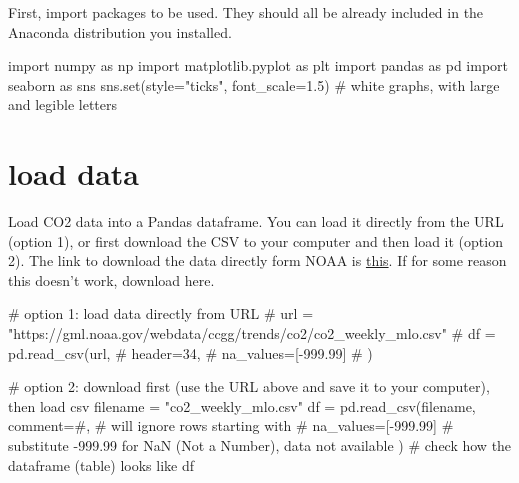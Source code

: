 \documentclass[
  letterpaper,
  DIV=11,
  numbers=noendperiod]{scrreprt}
\newenvironment{Shaded}{\begin{snugshade}}{\end{snugshade}}
\newcommand{\BuiltInTok}[1]{\textcolor[rgb]{0.00,0.23,0.31}{#1}}
\newcommand{\CommentTok}[1]{\textcolor[rgb]{0.37,0.37,0.37}{#1}}
\newcommand{\FloatTok}[1]{\textcolor[rgb]{0.68,0.00,0.00}{#1}}
\newcommand{\ImportTok}[1]{\textcolor[rgb]{0.00,0.46,0.62}{#1}}
\newcommand{\NormalTok}[1]{\textcolor[rgb]{0.00,0.23,0.31}{#1}}
\newcommand{\OperatorTok}[1]{\textcolor[rgb]{0.37,0.37,0.37}{#1}}
\newcommand{\StringTok}[1]{\textcolor[rgb]{0.13,0.47,0.30}{#1}}
\begin{document}
First, import packages to be used. They should all be already included
in the Anaconda distribution you installed.

\begin{Shaded}
\begin{Highlighting}[]
\ImportTok{import}\NormalTok{ numpy }\ImportTok{as}\NormalTok{ np}
\ImportTok{import}\NormalTok{ matplotlib.pyplot }\ImportTok{as}\NormalTok{ plt}
\ImportTok{import}\NormalTok{ pandas }\ImportTok{as}\NormalTok{ pd}
\ImportTok{import}\NormalTok{ seaborn }\ImportTok{as}\NormalTok{ sns}
\NormalTok{sns.}\BuiltInTok{set}\NormalTok{(style}\OperatorTok{=}\StringTok{"ticks"}\NormalTok{, font\_scale}\OperatorTok{=}\FloatTok{1.5}\NormalTok{)  }\CommentTok{\# white graphs, with large and legible letters}
\end{Highlighting}
\end{Shaded}

\section{load data}\label{load-data}

Load CO2 data into a Pandas dataframe. You can load it directly from the
URL (option 1), or first download the CSV to your computer and then load
it (option 2). The link to download the data directly form NOAA is
\href{https://gml.noaa.gov/webdata/ccgg/trends/co2/co2_weekly_mlo.csv}{this}.
If for some reason this doesn't work, download here.

\begin{Shaded}
\begin{Highlighting}[]
\CommentTok{\# option 1: load data directly from URL}
\CommentTok{\# url = "https://gml.noaa.gov/webdata/ccgg/trends/co2/co2\_weekly\_mlo.csv"}
\CommentTok{\# df = pd.read\_csv(url,}
\CommentTok{\#                  header=34,}
\CommentTok{\#                  na\_values=[{-}999.99]}
\CommentTok{\#                  )}

\CommentTok{\# option 2: download first (use the URL above and save it to your computer), then load csv}
\NormalTok{filename }\OperatorTok{=} \StringTok{"co2\_weekly\_mlo.csv"}
\NormalTok{df }\OperatorTok{=}\NormalTok{ pd.read\_csv(filename,}
\NormalTok{                comment}\OperatorTok{=}\StringTok{\textquotesingle{}\#\textquotesingle{}}\NormalTok{,  }\CommentTok{\# will ignore rows starting with \#}
\NormalTok{                 na\_values}\OperatorTok{=}\NormalTok{[}\OperatorTok{{-}}\FloatTok{999.99}\NormalTok{]  }\CommentTok{\# substitute {-}999.99 for NaN (Not a Number), data not available}
\NormalTok{                 )}
\CommentTok{\# check how the dataframe (table) looks like}
\NormalTok{df}
\end{Highlighting}
\end{Shaded}
\end{document}
